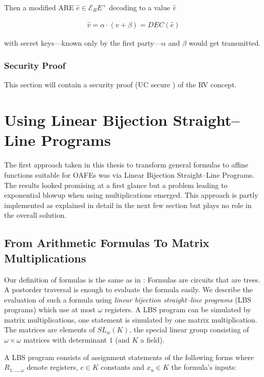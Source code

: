 \documentclass[12pt, a4paper]{article}
\begin{document}
\noindent{}Then a modified ARE $\hat{e} \in \mathcal{E}_RE^+$ decoding to a
value $\hat{v}$

\begin{align}
\hat{v} = \alpha \cdot (v + \beta) = DEC(\hat{e})
\end{align}

\noindent{}with secret keys---known only by the first party---$\alpha$ and
$\beta$ would get transmitted.

\subsubsection{Security Proof}
\label{sec:randomized-variables-proof}

This section will contain a security proof (UC secure \cite{canetti05}) of the
RV concept.


\section{Using Linear Bijection Straight--Line Programs}
\label{sec:using-lbs}

The first approach taken in this thesis to transform general formulas to affine
functions suitable for OAFEs was via Linear Bijection Straight--Line Programs.
The results looked promising at a first glance but a problem leading to
exponential blowup when using multiplications emerged. This approach is partly
implemented as explained in detail in the next few section but plays no role in
the overall solution.

\subsection{From Arithmetic Formulas To Matrix Multiplications}
\label{sec:FormulasToMatrixMuls}

Our definition of formulas is the same as in \cite{cleve91}: Formulas are
circuits that are trees. A postorder traversal is enough to evaluate the formula
easily. We describe the evaluation of such a formula using \emph{linear
bijection straight--line programs} (LBS programs)\cite{cleve91} which use at
most $\omega$ registers. A LBS program can be simulated by matrix
multiplications, one statement is simulated by one matrix multiplication. The
matrices are elements of $SL_w(K)$, the special linear group consisting of
$\omega \times \omega$ matrices with determinant $1$ (and $K$ a field).

A LBS program consists of assignment statements of the following
forms where $R_{1,...,\omega}$ denote registers, $c \in K$ constants and $x_u
\in K$ the formula's inputs:
\end{document}
